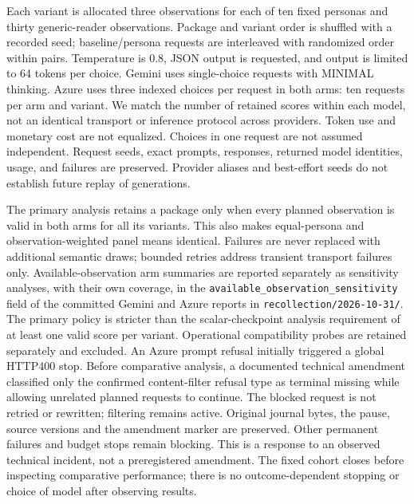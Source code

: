 Each variant is allocated three observations for each of ten fixed personas and thirty generic-reader
observations. Package and variant order is shuffled with a recorded seed; baseline/persona
requests are interleaved with randomized order within pairs. Temperature is $0.8$, JSON output
is requested, and output is limited to 64 tokens per choice. Gemini uses single-choice requests
with MINIMAL thinking. Azure uses three indexed choices per request in both arms: ten requests
per arm and variant. We match the number of retained scores within each model, not an identical
transport or inference protocol across providers. Token use and monetary cost are not equalized.
Choices in one request are not assumed
independent. Request seeds, exact prompts, responses, returned model identities, usage, and
failures are preserved. Provider aliases and best-effort seeds do not establish future replay
of generations.

The primary analysis retains a package only when every planned observation is valid in both
arms for all its variants. This also makes equal-persona and observation-weighted panel means
identical. Failures are never replaced with additional semantic draws; bounded retries address
transient transport failures only. Available-observation arm summaries are reported separately as sensitivity
analyses, with their own coverage, in the \texttt{available\_observation\_sensitivity} field of
the committed Gemini and Azure reports in \texttt{recollection/2026-10-31/}. The primary policy is stricter than the scalar-checkpoint analysis
requirement of at least one valid score per variant. Operational compatibility probes are retained
separately and excluded. An Azure prompt refusal initially triggered a global HTTP400 stop. Before comparative analysis,
a documented technical amendment classified only the confirmed content-filter refusal type as
terminal missing while allowing unrelated planned requests to continue. The blocked request is
not retried or rewritten; filtering remains active. Original journal bytes, the pause, source
versions and the amendment marker are preserved. Other permanent failures and budget stops remain
blocking. This is a response to an observed technical incident, not a preregistered amendment.
The fixed cohort closes before inspecting comparative performance;
there is no outcome-dependent stopping or choice of model after observing results.

